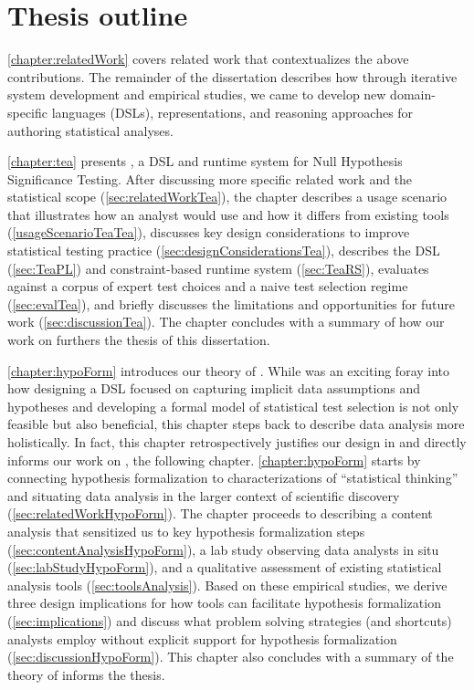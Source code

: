 
\section{Thesis outline}
\autoref{chapter:relatedWork} covers related work that contextualizes the above
contributions. The remainder of the dissertation describes how through iterative
system development and empirical studies, we came to develop new domain-specific
languages (DSLs), representations, and reasoning approaches for authoring
statistical analyses.

\autoref{chapter:tea} presents \tea, a DSL and runtime system for Null
Hypothesis Significance Testing. After discussing more specific related work and
the statistical scope (\autoref{sec:relatedWorkTea}), the chapter describes a
usage scenario that illustrates how an analyst would use \tea and how it differs
from existing tools (\autoref{usageScenarioTeaTea}), discusses key design
considerations to improve statistical testing practice
(\autoref{sec:designConsiderationsTea}), describes the DSL (\autoref{sec:TeaPL})
and constraint-based runtime system (\autoref{sec:TeaRS}), evaluates \tea
against a corpus of expert test choices and a naive test selection regime
(\autoref{sec:evalTea}), and briefly discusses the limitations and opportunities
for future work (\autoref{sec:discussionTea}). The chapter concludes with a
summary of how our work on \tea furthers the thesis of this dissertation. 

\autoref{chapter:hypoForm} introduces our theory of \hypoForm. While \tea was an
exciting foray into how designing a DSL focused on capturing implicit data
assumptions and hypotheses and developing a formal model of statistical test
selection is not only feasible but also beneficial, this chapter steps back to
describe data analysis more holistically. In fact, this chapter retrospectively
justifies our design in \tea and directly informs our work on \tisane, the
following chapter. \autoref{chapter:hypoForm} starts by connecting hypothesis
formalization to characterizations of ``statistical thinking'' and situating
data analysis in the larger context of scientific discovery
(\autoref{sec:relatedWorkHypoForm}). The chapter proceeds to describing a
content analysis that sensitized us to key hypothesis formalization steps
(\autoref{sec:contentAnalysisHypoForm}), a lab study observing data analysts in
situ (\autoref{sec:labStudyHypoForm}), and a qualitative assessment of existing
statistical analysis tools (\autoref{sec:toolsAnalysis}). Based on these
empirical studies, we derive three design implications for how tools can
facilitate hypothesis formalization (\autoref{sec:implications}) and discuss
what problem solving strategies (and shortcuts) analysts employ without explicit
support for hypothesis formalization (\autoref{sec:discussionHypoForm}). This
chapter also concludes with a summary of the theory of \hypoForm informs the
thesis. 

